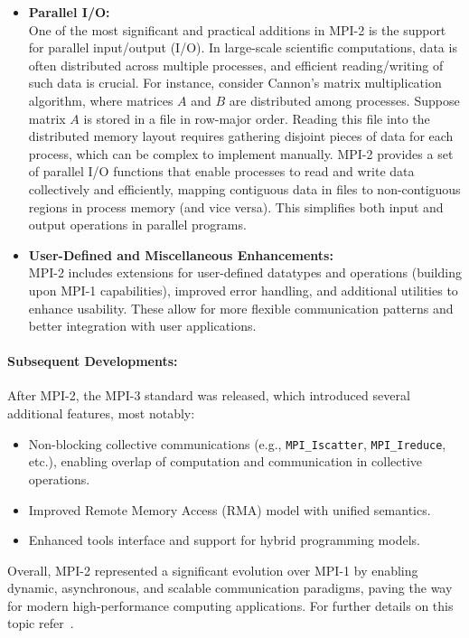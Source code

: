\documentclass[12pt]{book}
\begin{document}
\begin{itemize}
    \item \textbf{Parallel I/O:} \\
    One of the most significant and practical additions in MPI-2 is the support for parallel input/output (I/O). In large-scale scientific computations, data is often distributed across multiple processes, and efficient reading/writing of such data is crucial. For instance, consider Cannon's matrix multiplication algorithm, where matrices $A$ and $B$ are distributed among processes. Suppose matrix $A$ is stored in a file in row-major order. Reading this file into the distributed memory layout requires gathering disjoint pieces of data for each process, which can be complex to implement manually. MPI-2 provides a set of parallel I/O functions that enable processes to read and write data collectively and efficiently, mapping contiguous data in files to non-contiguous regions in process memory (and vice versa). This simplifies both input and output operations in parallel programs.

    \item \textbf{User-Defined and Miscellaneous Enhancements:} \\
    MPI-2 includes extensions for user-defined datatypes and operations (building upon MPI-1 capabilities), improved error handling, and additional utilities to enhance usability. These allow for more flexible communication patterns and better integration with user applications.
\end{itemize}

\paragraph{Subsequent Developments:}  
After MPI-2, the MPI-3 standard was released, which introduced several additional features, most notably:
\begin{itemize}
    \item Non-blocking collective communications (e.g., \texttt{MPI\_Iscatter}, \texttt{MPI\_Ireduce}, etc.), enabling overlap of computation and communication in collective operations.
    \item Improved Remote Memory Access (RMA) model with unified semantics.
    \item Enhanced tools interface and support for hybrid programming models.
\end{itemize}

Overall, MPI-2 represented a significant evolution over MPI-1 by enabling dynamic, asynchronous, and scalable communication paradigms, paving the way for modern high-performance computing applications. For further details on this topic refer~\cite{thakur1998case}.
\end{document}
